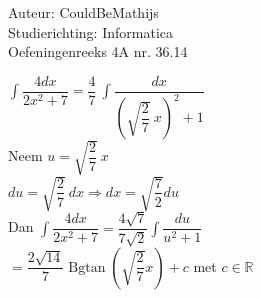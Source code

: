 \documentclass[a4paper]{article}
\newcommand{\intt}{\displaystyle\int}
\newcommand{\Bgtan}{\operatorname{Bgtan}}
\begin{document}
  
\noindent \large Auteur: CouldBeMathijs \\
\noindent \large Studierichting: Informatica\\
\noindent \large Oefeningenreeks 4A nr. 36.14\\

\medskip

\normalsize

$\intt \dfrac{4dx}{2x^2+7} = \dfrac{4}{7} \ \intt \dfrac{dx}{\left(\sqrt{\dfrac{2}{7}} \ x\right)^2+1}$\\

Neem $u = \sqrt{\dfrac{2}{7}} \ x$\\

$du = \sqrt{\dfrac{2}{7}} \ dx \Rightarrow dx = \sqrt{\dfrac{7}{2}} du$\\

Dan $\intt \dfrac{4dx}{2x^2+7} = \dfrac{4 \sqrt{7}}{7 \sqrt{2}} \intt \dfrac{du}{u^2+1}$\\

$= \dfrac{2 \sqrt{14}}{7} \Bgtan \left( \sqrt{\dfrac{2}{7}}x \right) + c$ met $c \in \mathbb{R}$

\begin{thebibliography}{999}
\end{thebibliography}
\end{document}
